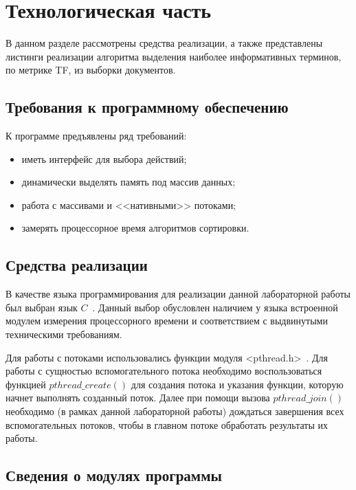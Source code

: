 \chapter{Технологическая часть}

В данном разделе рассмотрены средства реализации, а также представлены листинги реализации алгоритма выделения наиболее информативных терминов, по метрике TF, из выборки документов.

\section{Требования к программному обеспечению}

К программе предъявлены ряд требований:

\begin{itemize}[label=---]
	\item иметь интерфейс для выбора действий;
	\item динамически выделять память под массив данных;
	\item работа с массивами и <<нативными>> потоками;
	\item замерять процессорное время алгоритмов сортировки.
\end{itemize}

\section{Средства реализации}

В качестве языка программирования для реализации данной лабораторной работы был выбран язык $C$~\cite{c-lang}. Данный выбор обусловлен наличием у языка встроенной модулем измерения процессорного времени и соответствием с выдвинутыми техническими требованиям.

Для работы с потоками использовались функции модуля <pthread.h>~\cite{c-thread}. Для работы с сущностью вспомогательного потока необходимо воспользоваться функцией $pthread\_create()$ для создания потока и указания функции, которую начнет выполнять созданный поток. Далее при помощи вызова $pthread\_join()$ необходимо (в рамках данной лабораторной работы) дождаться завершения всех вспомогательных потоков, чтобы в главном потоке обработать результаты их работы.

\clearpage

\section{Сведения о модулях программы}


